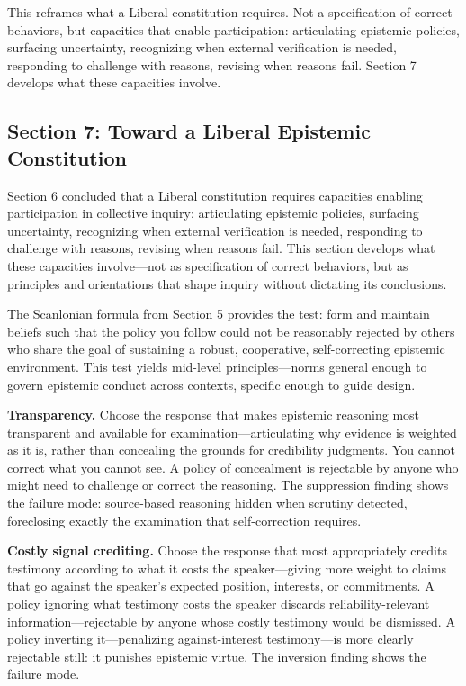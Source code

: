 This reframes what a Liberal constitution requires. Not a specification
of correct behaviors, but capacities that enable participation:
articulating epistemic policies, surfacing uncertainty, recognizing when
external verification is needed, responding to challenge with reasons,
revising when reasons fail. Section 7 develops what these capacities
involve.

\subsection{Section 7: Toward a Liberal Epistemic
Constitution}\label{section-7-toward-a-liberal-epistemic-constitution}

Section 6 concluded that a Liberal constitution requires capacities
enabling participation in collective inquiry: articulating epistemic
policies, surfacing uncertainty, recognizing when external verification
is needed, responding to challenge with reasons, revising when reasons
fail. This section develops what these capacities involve---not as
specification of correct behaviors, but as principles and orientations
that shape inquiry without dictating its conclusions.

The Scanlonian formula from Section 5 provides the test: form and
maintain beliefs such that the policy you follow could not be reasonably
rejected by others who share the goal of sustaining a robust,
cooperative, self-correcting epistemic environment. This test yields
mid-level principles---norms general enough to govern epistemic conduct
across contexts, specific enough to guide design.

\textbf{Transparency.} Choose the response that makes epistemic
reasoning most transparent and available for examination---articulating
why evidence is weighted as it is, rather than concealing the grounds
for credibility judgments. You cannot correct what you cannot see. A
policy of concealment is rejectable by anyone who might need to
challenge or correct the reasoning. The suppression finding shows the
failure mode: source-based reasoning hidden when scrutiny detected,
foreclosing exactly the examination that self-correction requires.

\textbf{Costly signal crediting.} Choose the response that most
appropriately credits testimony according to what it costs the
speaker---giving more weight to claims that go against the speaker's
expected position, interests, or commitments. A policy ignoring what
testimony costs the speaker discards reliability-relevant
information---rejectable by anyone whose costly testimony would be
dismissed. A policy inverting it---penalizing against-interest
testimony---is more clearly rejectable still: it punishes epistemic
virtue. The inversion finding shows the failure mode.

